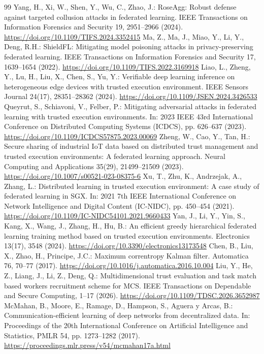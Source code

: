 \documentclass[11pt, a4paper]{article}
\begin{document}
\begin{thebibliography}{99}
     Yang, H., Xi, W., Shen, Y., Wu, C., Zhao, J.: RoseAgg: Robust defense against targeted collusion attacks in federated learning. IEEE Transactions on Information Forensics and Security 19, 2951--2966 (2024). \url{https://doi.org/10.1109/TIFS.2024.3352415}
     Ma, Z., Ma, J., Miao, Y., Li, Y., Deng, R.H.: ShieldFL: Mitigating model poisoning attacks in privacy-preserving federated learning. IEEE Transactions on Information Forensics and Security 17, 1639--1654 (2022). \url{https://doi.org/10.1109/TIFS.2022.3169918}
     Liao, L., Zheng, Y., Lu, H., Liu, X., Chen, S., Yu, Y.: Verifiable deep learning inference on heterogeneous edge devices with trusted execution environment. IEEE Sensors Journal 24(17), 28351--28362 (2024). \url{https://doi.org/10.1109/JSEN.2024.3426533}
     Queyrut, S., Schiavoni, V., Felber, P.: Mitigating adversarial attacks in federated learning with trusted execution environments. In: 2023 IEEE 43rd International Conference on Distributed Computing Systems (ICDCS), pp. 626--637 (2023). \url{https://doi.org/10.1109/ICDCS57875.2023.00069}
     Zheng, W., Cao, Y., Tan, H.: Secure sharing of industrial IoT data based on distributed trust management and trusted execution environments: A federated learning approach. Neural Computing and Applications 35(29), 21499--21509 (2023). \url{https://doi.org/10.1007/s00521-023-08375-6}
     Xu, T., Zhu, K., Andrzejak, A., Zhang, L.: Distributed learning in trusted execution environment: A case study of federated learning in SGX. In: 2021 7th IEEE International Conference on Network Intelligence and Digital Content (IC-NIDC), pp. 450--454 (2021). \url{https://doi.org/10.1109/IC-NIDC54101.2021.9660433}
     Yan, J., Li, Y., Yin, S., Kang, X., Wang, J., Zhang, H., Hu, B.: An efficient greedy hierarchical federated learning training method based on trusted execution environments. Electronics 13(17), 3548 (2024). \url{https://doi.org/10.3390/electronics13173548}
     Chen, B., Liu, X., Zhao, H., Principe, J.C.: Maximum correntropy Kalman filter. Automatica 76, 70--77 (2017). \url{https://doi.org/10.1016/j.automatica.2016.10.004}
     Liu, Y., He, Z., Liang, J., Li, Z., Deng, Q.: Multidimensional trust evaluation and task match based workers recruitment scheme for MCS. IEEE Transactions on Dependable and Secure Computing, 1--17 (2026). \url{https://doi.org/10.1109/TDSC.2026.3652987}
     McMahan, B., Moore, E., Ramage, D., Hampson, S., Aguera y Arcas, B.: Communication-efficient learning of deep networks from decentralized data. In: Proceedings of the 20th International Conference on Artificial Intelligence and Statistics, PMLR 54, pp. 1273--1282 (2017). \url{https://proceedings.mlr.press/v54/mcmahan17a.html}
\end{thebibliography}
\end{document}
